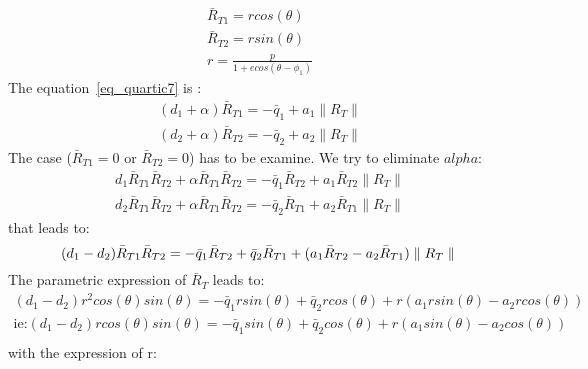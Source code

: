 \begin{equation}
\label{eq_quartic8}
\begin{array}{l}
\bar R_{T1}=r cos(\theta )\\
\bar R_{T2}=r sin(\theta )\\
r=\frac{p}{1+ecos(\theta - \phi_1)}
\end{array}
\end{equation}
The equation~\ref{eq_quartic7} is :
\begin{equation}
\label{eq_quartic9}
\begin{array}{l}
  (d_1+\alpha)\bar R_{T1}=-\bar q_1+a_1 \parallel R_T \parallel\\
(d_2+\alpha)\bar R_{T2}=-\bar q_2+a_2 \parallel R_T \parallel
\end{array}
\end{equation}
The case ($\bar R_{T1} = 0$ or  $\bar R_{T2} = 0$) has to be examine. We try to eliminate $alpha$:
\begin{equation}
\label{eq_quartic10}
  \begin{array}{l}
    d_1 \bar R_{T1} \bar R_{T2}+\alpha \bar R_{T1} \bar R_{T2} =-\bar q_1\bar R_{T2}+a_1 \bar R_{T2} \parallel R_T \parallel\\
d_2 \bar R_{T1} \bar R_{T2}+\alpha \bar R_{T1} \bar R_{T2} =-\bar q_2\bar R_{T1}+a_2 \bar R_{T1} \parallel R_T \parallel
\end{array}
\end{equation}
that leads to:
\begin{equation}
\label{eq_quartic10}
  (d_1-d_2) \bar R_{T1} \bar R_{T2}=-\bar q_1\bar R_{T2}+\bar q_2\bar R_{T1}+(a_1 \bar R_{T2}-a_2 \bar R_{T1}) \parallel R_T \parallel\\
\end{equation}
The parametric expression of $\bar R_T$ leads to:
\begin{equation}
\label{eq_quartic11}
\begin{array}{l}
  (d_1-d_2)r^2cos(\theta )sin(\theta )=-\bar q_1rsin(\theta )+\bar q_2rcos(\theta )+r(a_1 rsin(\theta )-a_2 rcos(\theta )) \\
  \textrm{ie:}(d_1-d_2)rcos(\theta )sin(\theta )=-\bar q_1sin(\theta )+\bar q_2cos(\theta )+r(a_1 sin(\theta )-a_2 cos(\theta ))\\
  \end{array}
\end{equation}
with the expression of r:
